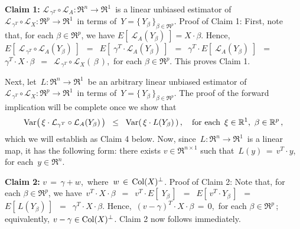 \vskip 0.5cm
\noindent
\textbf{Claim 1:}\quad
$\mathcal{L}_{\,\gamma^{T}} \circ \mathcal{L}_{A} : \Re^{n} \longrightarrow \Re^{1}$\,
is a linear unbiased estimator of
\,$\mathcal{L}_{\,\gamma^{T}} \circ \mathcal{L}_{X} : \Re^{p} \longrightarrow \Re^{1}$\,
in terms of \,$Y = \{\,Y_{\beta}\,\}_{\beta\in\Re^{p}}$.
\vskip 0.1cm
\noindent
Proof of Claim 1:\quad
First, note that, for each $\beta\in\Re^{p}$, we have $E\!\left[\; \mathcal{L}_{A}(Y_{\beta})\;\right] = X \cdot \beta$.
Hence,
$E\!\left[\;\mathcal{L}_{\,\gamma^{T}} \circ \mathcal{L}_{A}(Y_{\beta})\;\right]$
\,$=$\, $E\!\left[\;\gamma^{T} \cdot \mathcal{L}_{A}(Y_{\beta})\;\right]$
\,$=$\, $\gamma^{T} \cdot E\!\left[\; \mathcal{L}_{A}(Y_{\beta})\;\right]$
\,$=$\, $\gamma^{T} \cdot X \cdot \beta$
\,$=$\, $\mathcal{L}_{\,\gamma^{T}} \circ \mathcal{L}_{X}(\,\beta\,)$,\,
for each $\beta\in\Re^{p}$.
This proves Claim 1.

\vskip 0.5cm
\noindent
Next, let
\,$L : \Re^{n} \longrightarrow \Re^{1}$\,
be an arbitrary linear unbiased estimator of
\,$\mathcal{L}_{\,\gamma^{T}} \circ \mathcal{L}_{X} : \Re^{p} \longrightarrow \Re^{1}$\,
in terms of \,$Y = \{\,Y_{\beta}\,\}_{\beta\in\Re^{p}}$.
The proof of the forward implication will be complete once we show that
\begin{equation*}
\textnormal{Var}\!\left(\,\xi\cdot\mathcal{L}_{\gamma^{T}}\circ\mathcal{L}_{A}(Y_{\beta})\,\right)
\;\; \leq \;\;
	\textnormal{Var}\!\left(\,\xi \cdot L(Y_{\beta})\,\right),
\quad
\textnormal{for each \,$\xi \in \mathbb{R}^{1}$, \,$\beta\in\mathbb{R}^{p}$}\,,
\end{equation*}
which we will establish as Claim 4 below.
Now, since \,$L : \Re^{n} \longrightarrow \Re^{1}$\,
is a linear map, it has the following form:
there exists $v \in \Re^{n \times 1}$ such that
\,$L(y) \,=\, v^{T} \cdot y$,\,
for each \,$y \in \Re^{n}$.

\vskip 0.5cm
\noindent
\textbf{Claim 2:}\quad
$v \,=\, \gamma + w$,\, where \,$w \,\in\, \textnormal{Col}(X)^{\perp}$.
\vskip 0.1cm
\noindent
Proof of Claim 2:\quad
Note that, for each $\beta \in \Re^{p}$, we have
\,$v^{T}\cdot X \cdot \beta$
\,$=$\, $v^{T} \cdot E\!\left[\;Y_{\beta}\,\right]$
\,$=$\, $E\!\left[\,v^{T} \cdot Y_{\beta}\,\right]$
\,$=$\, $E\!\left[\,L(Y_{\beta})\,\right]$
\,$=$\, $\gamma^{T} \cdot X \cdot \beta$.
Hence,
\,$(v - \gamma)^{T} \cdot X \cdot \beta \,=\, 0$,\,
for each $\beta\in\Re^{p}$\,;
equivalently, $v - \gamma \in \textnormal{Col}(X)^{\perp}$.
Claim 2 now follows immediately.


